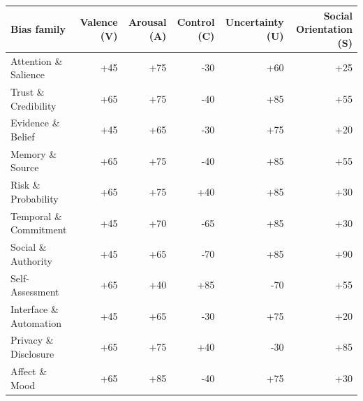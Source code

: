 \begin{tabularx}{\linewidth}{Xrrrrr}
\toprule
Bias family & Valence (V) & Arousal (A) & Control (C) & Uncertainty (U) & Social Orientation (S) \\
\midrule
Attention \& Salience & +45 & +75 & -30 & +60 & +25 \\
Trust \& Credibility & +65 & +75 & -40 & +85 & +55 \\
Evidence \& Belief & +45 & +65 & -30 & +75 & +20 \\
Memory \& Source & +65 & +75 & -40 & +85 & +55 \\
Risk \& Probability & +65 & +75 & +40 & +85 & +30 \\
Temporal \& Commitment & +45 & +70 & -65 & +85 & +30 \\
Social \& Authority & +45 & +65 & -70 & +85 & +90 \\
Self-Assessment & +65 & +40 & +85 & -70 & +55 \\
Interface \& Automation & +45 & +65 & -30 & +75 & +20 \\
Privacy \& Disclosure & +65 & +75 & +40 & -30 & +85 \\
Affect \& Mood & +65 & +85 & -40 & +75 & +30 \\
\bottomrule
\end{tabularx}
